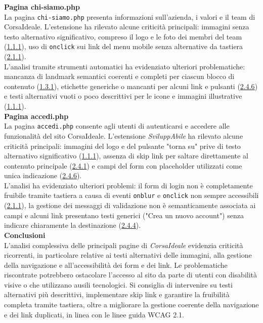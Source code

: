\noindent \textbf{Pagina chi-siamo.php}\\
La pagina \texttt{chi-siamo.php} presenta informazioni sull’azienda, i valori e il team di CorsaIdeale. 
L’estensione ha rilevato alcune criticità principali: immagini senza testo alternativo significativo, compreso il logo e le foto dei membri del team ({\hyperref[wcag:1.1.1]{1.1.1}}), uso di \texttt{onclick} sui link del menu mobile senza alternative da tastiera ({\hyperref[wcag:2.1.1]{2.1.1}}).\\
L’analisi tramite strumenti automatici ha evidenziato ulteriori problematiche: mancanza di landmark semantici coerenti e completi per ciascun blocco di contenuto ({\hyperref[wcag:1.3.1]{1.3.1}}), etichette generiche o mancanti per alcuni link e pulsanti ({\hyperref[wcag:2.4.6]{2.4.6}}) e testi alternativi vuoti o poco descrittivi per le icone e immagini illustrative ({\hyperref[wcag:1.1.1]{1.1.1}}).\\

\noindent \textbf{Pagina accedi.php}\\
La pagina \texttt{accedi.php} consente agli utenti di autenticarsi e accedere alle funzionalità del sito CorsaIdeale. 
L’estensione \textit{SviluppAbile} ha rilevato alcune criticità principali: immagini del logo e del pulsante "torna su" prive di testo alternativo significativo ({\hyperref[wcag:1.1.1]{1.1.1}}), assenza di skip link per saltare direttamente al contenuto principale ({\hyperref[wcag:2.4.1]{2.4.1}}) e campi del form con placeholder utilizzati come unica indicazione ({\hyperref[wcag:2.4.6]{2.4.6}}).\\
L’analisi ha evidenziato ulteriori problemi: il form di login non è completamente fruibile tramite tastiera a causa di eventi \texttt{onblur} e \texttt{onclick} non sempre accessibili ({\hyperref[wcag:2.1.1]{2.1.1}}), la gestione dei messaggi di validazione non è semanticamente associata ai campi e alcuni link presentano testi generici ("Crea un nuovo account") senza indicare chiaramente la destinazione ({\hyperref[wcag:2.4.4]{2.4.4}}).\\

\noindent \textbf{Conclusioni}\\
L’analisi complessiva delle principali pagine di \textit{CorsaIdeale} evidenzia criticità ricorrenti, in particolare relative ai testi alternativi delle immagini, alla gestione della navigazione e all’accessibilità dei form e dei link. Le problematiche riscontrate potrebbero ostacolare l’accesso al sito da parte di utenti con disabilità visive o che utilizzano ausili tecnologici. Si consiglia di intervenire su testi alternativi più descrittivi, implementare skip link e garantire la fruibilità completa tramite tastiera, oltre a migliorare la gestione coerente della navigazione e dei link duplicati, in linea con le linee guida WCAG 2.1.

